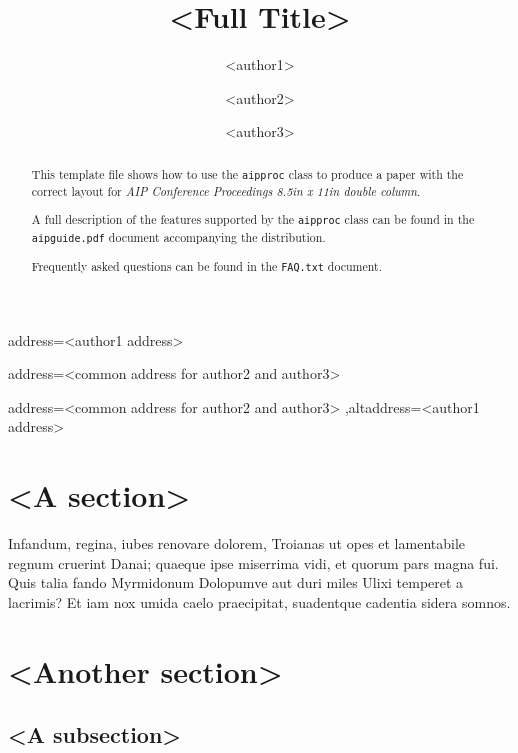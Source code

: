 \documentclass[
    ,final            %
  ]
  {aipproc}
\begin{document}
\title{<Full Title>}


\author{<author1>}{
  address={<author1 address>}
}

\author{<author2>}{
  address={<common address for author2 and author3>}
}

\author{<author3>}{
  address={<common address for author2 and author3>}
  ,altaddress={<author1 address>} %
}


\begin{abstract}
 This template file shows how to use the \texttt{aipproc} class to
 produce a paper with the correct layout for \emph{%
   AIP Conference Proceedings  8.5in x 11in double column}.

 A full description of the features supported by the \texttt{aipproc}
 class can be found in the \texttt{aipguide.pdf} document accompanying
 the distribution.

 Frequently asked questions can be found in the \texttt{FAQ.txt}
 document.
\end{abstract}

\maketitle


\section{<A section>}

  Infandum, regina, iubes renovare dolorem, Troianas ut opes et
  lamentabile regnum cruerint Danai; quaeque ipse miserrima vidi, et
  quorum pars magna fui. Quis talia fando Myrmidonum Dolopumve aut
  duri miles Ulixi temperet a lacrimis? Et iam nox umida caelo
  praecipitat, suadentque cadentia sidera somnos.

\section{<Another section>}

\subsection{<A subsection>}
\end{document}

